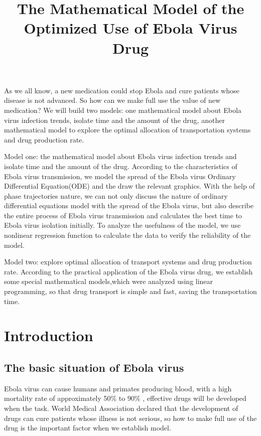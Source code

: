 \documentclass{icmmcm}
\title{The Mathematical Model of the Optimized Use of Ebola Virus Drug}
\begin{document}
\begin{summary}
As we all know, a new medication could stop Ebola and cure
patients whose disease is not advanced. So how can we make full
use the value of new medication? We will build two models:
one mathematical model about Ebola virus infection trends,
isolate time and the amount of the drug, another mathematical
model to explore the optimal allocation of transportation 
systems and drug production rate.
\par Model one: the mathematical model about Ebola virus
infection trends and isolate time and the amount of the drug.
According to the characteristics of Ebola virus transmission,
we model the spread of the Ebola virus Ordinary Differential
Equation(ODE) and the draw the relevant graphics. With the help
of phase trajectories nature, we can not only discuss the
nature of ordinary differential equations model with the spread
of the Ebola virus, but also describe the entire process of
Ebola virus transmission and calculates the best time to 
Ebola virus isolation initially.
To analyze the usefulness of the model, we use nonlinear
regression function to calculate the data  to verify the
reliability of the model.
\par Model two: explore optimal allocation of transport systems 
and drug production rate. According to the practical
application of the Ebola virus drug, we establish some special
mathematical models,which were analyzed using linear
programming, so that drug transport is simple and fast,
saving the transportation time.
\end{summary}

\maketitle
\thispagestyle{fancy}


\section{Introduction}
\subsection{The basic situation of Ebola virus}
Ebola virus can cause humans and primates producing blood, with
a high mortality rate of approximately 50\% to 90\% \cite{bib1},
effective drugs will be developed when the task. World Medical
Association declared that the development of drugs can cure
patients whose illness is not serious, so how to make full
use of the drug is the important factor when we establish
model.
\end{document}
